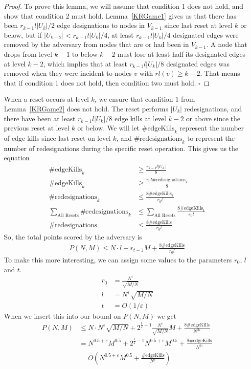 \begin{proof}
To prove this lemma, we will assume that condition 1 does not hold, and show that condition 2 must hold.
Lemma~\ref{KRGame1} gives us that there has been $r_{k-1}l|U_k|/2$ edge designations to nodes in $V_{k-1}$ since last reset at level $k$ or below, but if $|U_{k-2}|< r_{k-1}l|U_k|/4$,
at least $r_{k-1}l|U_k|/4$ designated edges were removed by the adversary from nodes that are or had been in $V_{k-1}$.
A node that drops from level $k-1$ to below $k-2$ must lose at least half its designated edges at level $k-2$, which implies that at least $r_{k-1}l|U_k|/8$ designated edges was removed when they were incident to nodes $v$ with $rl(v) \geq k-2$.
That means that if condition 1 does not hold, then condition two must hold.
$\square$
\end{proof}
When a reset occurs at level $k$, we ensure that condition 1 from Lemma~\ref{KRGame2} does not hold.
The reset performs $|U_k|$ redesignations, and there have been at least $r_{k-1}l|U_k|/8$ edge kills at level $k-2$ or above since the previous reset at level $k$ or below.
We will let $\mathrm{\#edgeKills}_k$ represent the number of edge kills since last reset on level $k$, and $\mathrm{\#redesignations}_k$ to represent the number of redesignations during the specific reset operation.
This gives us the equation 
\begin{align*}
\mathrm{\#edgeKills}_k &\geq \frac{r_{k-1}l|U_k|}{8} \\
\mathrm{\#edgeKills}_k &\geq \frac{r_0l\mathrm{\#redesignations}_k}{8} \\
\mathrm{\#redesignations}_k&\leq\frac{8\mathrm{\#edgeKills}_k}{r_0l} \\
\sum\limits_{\text{All Resets}}{\mathrm{\#redesignations}_k} &\leq \sum\limits_{\text{All Resets}}{\frac{8\mathrm{\#edgeKills}_k}{r_0l}} \\
\mathrm{\#redesignations} &\leq \frac{8\mathrm{\#edgeKills}}{r_0l}
\end{align*}
So, the total points scored by the adversary is
\begin{align*}
P(N, M) \leq N\cdot l + r_{t-1}M + \frac{8\mathrm{\#edgeKills}}{r_0l}
\end{align*}
To make this more interesting, we can assign some values to the parameters $r_0$, $l$ and $t$.
\begin{align*}
r_0 &= \frac{N^\varepsilon}{\sqrt{M/N}}\\
l &= N^\varepsilon \sqrt{M/N}\\ 
t &= O(1/\varepsilon)
\end{align*}
When we insert this into our bound on $P(N, M)$ we get
\begin{align*}
P(N, M) &\leq N\cdot N^\varepsilon \sqrt{M/N} + 2^{\frac{1}{\varepsilon} - 1} \frac{N^\varepsilon}{\sqrt{M/N}}M + \frac{8\mathrm{\#edgeKills}}{N^{2\varepsilon}}\\
&=N^{0.5+\varepsilon}M^{0.5}+2^{\frac{1}{\varepsilon} - 1}N^{0.5+\varepsilon}M^{0.5}+\frac{8\mathrm{\#edgeKills}}{N^{2\varepsilon}}\\
&=O\left(N^{0.5+\varepsilon}M^{0.5} + \frac{\mathrm{\#edgeKills}}{N^{\varepsilon}}\right)
\end{align*}


